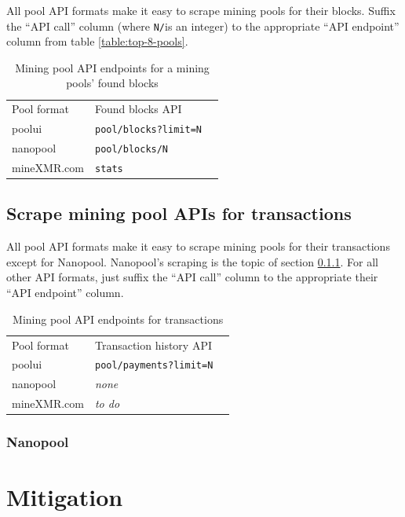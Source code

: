 \documentclass[notitlepage]{report}
\begin{document}
All pool API formats make it easy to scrape mining pools for their blocks.  Suffix the ``API call'' column (where \texttt{N/}is an integer) to the appropriate ``API endpoint'' column from table \ref{table:top-8-pools}.

\begin{table}[h]
\centering
\caption{Mining pool API endpoints for a mining pools' found blocks}
\begin{tabular}{lll}
Pool format     & Found blocks API             \\
poolui          & \texttt{pool/blocks?limit=N} \\
nanopool        & \texttt{pool/blocks/N}       \\
mineXMR.com     & \texttt{stats}
\end{tabular}
\label{table:blocks-api}
\end{table}


\subsection{Scrape mining pool APIs for transactions}

All pool API formats make it easy to scrape mining pools for their transactions except for Nanopool.  Nanopool's scraping is the topic of section \ref{sec:nanopool}.  For all other API formats, just suffix the ``API call'' column to the appropriate their ``API endpoint'' column.

\begin{table}[h]
\centering
\caption{Mining pool API endpoints for transactions}
\begin{tabular}{lll}
Pool format     & Transaction history API        \\
poolui          & \texttt{pool/payments?limit=N} \\
nanopool        & \textit{none}                  \\ %
mineXMR.com     & \textit{to do}
\end{tabular}
\label{table:transactions-api}
\end{table}

\subsubsection{Nanopool} \label{sec:nanopool}

\section{Mitigation}
\end{document}

